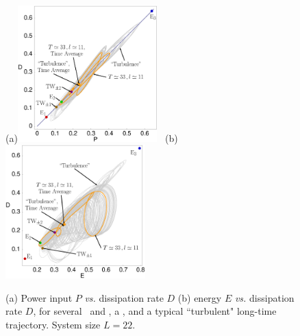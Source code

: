 

\begin{figure}[t]
\begin{center}
(a)\!\!\!\!\includegraphics[width=0.48\textwidth]{figs/energyBalance_pst.eps}%
~(b)\!\!\!\!\includegraphics[width=0.48\textwidth]{figs/EDequiva_pst.eps}
\end{center}
\caption{
(a) Power input $P$ {\em vs.}
dissipation rate $D$ 
(b) energy $E$  {\em vs.}
dissipation rate $D$,   for several  \eqva\ and \reqva,
a \rpo , and a typical ``turbulent" long-time trajectory.
System size $L=22$.
        }
\label{f:drivedrag}
\end{figure}

